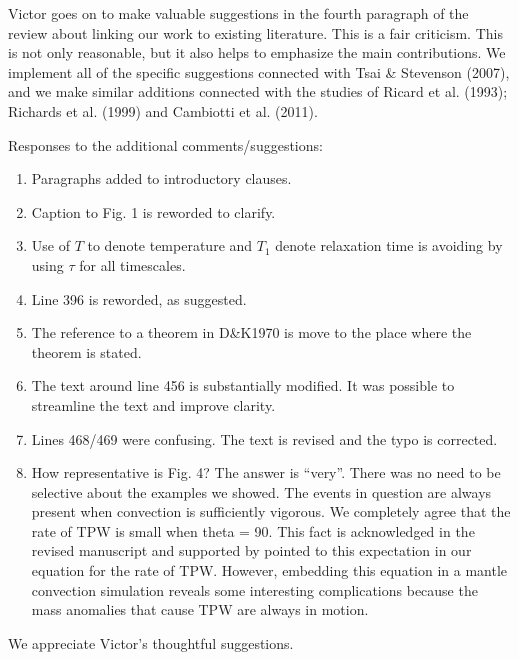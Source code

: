 \documentclass[a4paper,12pt]{article}
\begin{document}
Victor goes on to make valuable suggestions in the fourth paragraph of the review about linking our work to existing literature.
This is a fair criticism.
This is not only reasonable, but it also helps to emphasize the main contributions.
We implement all of the specific suggestions connected with Tsai \& Stevenson (2007), and we make similar additions connected with the studies of 
Ricard et al. (1993); Richards et al. (1999) and Cambiotti et al. (2011).

Responses to the additional comments/suggestions:

\begin{enumerate}

\item Paragraphs added to introductory clauses.

\item Caption to Fig. 1 is reworded to clarify.

\item Use of $T$ to denote temperature and $T_1$ denote relaxation time is avoiding by using $\tau$ for all timescales.

\item Line 396 is reworded, as suggested.

\item The reference to a theorem in D\&K1970 is move to the place where the theorem is stated.

\item The text around line 456 is substantially modified. It was possible to streamline the text and improve clarity.

\item Lines 468/469 were confusing. The text is revised and the typo is corrected.

\item How representative is Fig. 4? The answer is ``very''. There was no need to be selective about the examples we showed. The events in question are always present when convection is sufficiently vigorous. We completely agree that the rate of TPW is small when theta = 90. This fact is acknowledged in the revised manuscript and supported by pointed to this expectation in our equation for the rate of TPW. However, embedding this equation in a mantle convection simulation reveals some interesting complications because the mass anomalies that cause TPW are always in motion.

\end{enumerate}

We appreciate Victor's thoughtful suggestions.
\end{document}
